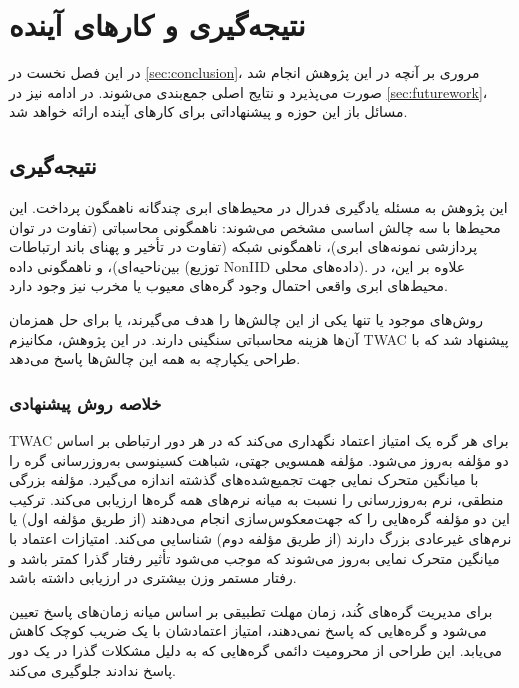 
\chapter{نتیجه‌گیری و کارهای آینده}
\label{chap:conclusion}

در این فصل نخست در \autoref{sec:conclusion}، مروری بر آنچه در این پژوهش انجام شد صورت می‌پذیرد و نتایج اصلی جمع‌بندی می‌شوند. در ادامه نیز در \autoref{sec:futurework}، مسائل باز این حوزه و پیشنهاداتی برای کارهای آینده ارائه خواهد شد.

\section{نتیجه‌گیری}
\label{sec:conclusion}

این پژوهش به مسئله یادگیری فدرال در محیط‌های ابری چندگانه ناهمگون پرداخت. این محیط‌ها با سه چالش اساسی مشخص می‌شوند: ناهمگونی محاسباتی (تفاوت در توان پردازشی نمونه‌های ابری)، ناهمگونی شبکه (تفاوت در تأخیر و پهنای باند ارتباطات بین‌ناحیه‌ای)، و ناهمگونی داده (توزیع \gls{NonIID} داده‌های محلی). علاوه بر این، در محیط‌های ابری واقعی احتمال وجود گره‌های معیوب یا مخرب نیز وجود دارد.

روش‌های موجود یا تنها یکی از این چالش‌ها را هدف می‌گیرند، یا برای حل همزمان آن‌ها هزینه محاسباتی سنگینی دارند. در این پژوهش، مکانیزم \gls{TWAC} پیشنهاد شد که با طراحی یکپارچه به همه این چالش‌ها پاسخ می‌دهد.

\subsection{خلاصه روش پیشنهادی}

\gls{TWAC} برای هر گره یک امتیاز اعتماد نگهداری می‌کند که در هر دور ارتباطی بر اساس دو مؤلفه به‌روز می‌شود. مؤلفه همسویی جهتی، شباهت کسینوسی به‌روزرسانی گره را با میانگین متحرک نمایی جهت تجمیع‌شده‌های گذشته اندازه می‌گیرد. مؤلفه بزرگی منطقی، نرم به‌روزرسانی را نسبت به میانه نرم‌های همه گره‌ها ارزیابی می‌کند. ترکیب این دو مؤلفه گره‌هایی را که جهت‌معکوس‌سازی انجام می‌دهند (از طریق مؤلفه اول) یا نرم‌های غیرعادی بزرگ دارند (از طریق مؤلفه دوم) شناسایی می‌کند. امتیازات اعتماد با میانگین متحرک نمایی به‌روز می‌شوند که موجب می‌شود تأثیر رفتار گذرا کمتر باشد و رفتار مستمر وزن بیشتری در ارزیابی داشته باشد.

برای مدیریت گره‌های کُند، زمان مهلت تطبیقی بر اساس میانه زمان‌های پاسخ تعیین می‌شود و گره‌هایی که پاسخ نمی‌دهند، امتیاز اعتمادشان با یک ضریب کوچک کاهش می‌یابد. این طراحی از محرومیت دائمی گره‌هایی که به دلیل مشکلات گذرا در یک دور پاسخ ندادند جلوگیری می‌کند.

